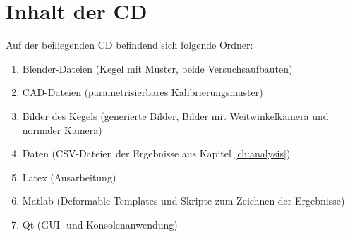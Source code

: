 \chapter{Inhalt der CD}
\label{ch:cdContent}

Auf der beiliegenden CD befindend sich folgende Ordner:
\begin{enumerate}
	\item Blender-Dateien (Kegel mit Muster, beide Versuchsaufbauten)
	\item CAD-Dateien (parametrisierbares Kalibrierungsmuster)
	\item Bilder des Kegels (generierte Bilder, Bilder mit Weitwinkelkamera und normaler Kamera)
	\item Daten (CSV-Dateien der Ergebnisse aus Kapitel \ref{ch:analysis})
	\item Latex (Ausarbeitung)
	\item Matlab (Deformable Templates und Skripte zum Zeichnen der Ergebnisse)
	\item Qt (GUI- und Konsolenanwendung)
	
\end{enumerate}